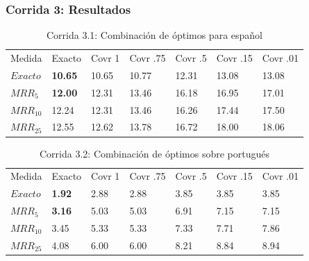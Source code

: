 \begin{frame}
\frametitle{Corrida 3: Resultados}


\begin{table}
\centering
\begin{center}
\begin{tabular}{|l | l | l | l | l | l | l |}

Medida & Exacto & Covr 1 & Covr .75 & Covr .5 & Covr .15 & Covr .01 \\ 
$Exacto$ & {\color{green}\textbf{10.65}} & 10.65 & 10.77 & 12.31 & 13.08 & 13.08  \\ 
$MRR_{5}$ & {\color{green}\textbf{12.00}} & 12.31 & 13.46 & 16.18 & 16.95 & 17.01  \\ 
$MRR_{10}$ & 12.24 & 12.31 & 13.46 & 16.26 & 17.44 & 17.50  \\ 
$MRR_{25}$ & 12.55 & 12.62 & 13.78 & 16.72 & 18.00 & 18.06  \\ 
\end{tabular}
\medskip
\caption{Corrida 3.1: Combinación de óptimos para español}
\label{table:optimos}
\end{center}
\end{table}

\begin{table}
\centering
\begin{center}
\begin{tabular}{|l | l | l | l | l | l | l |}

Medida & Exacto & Covr 1 & Covr .75 & Covr .5 & Covr .15 & Covr .01 \\ 
$Exacto$ & {\color{green}\textbf{1.92}} & 2.88 & 2.88 & 3.85 & 3.85 & 3.85  \\ 
$MRR_{5}$ & {\color{green}\textbf{3.16}} & 5.03 & 5.03 & 6.91 & 7.15 & 7.15  \\ 
$MRR_{10}$ & 3.45 & 5.33 & 5.33 & 7.33 & 7.71 & 7.86  \\ 
$MRR_{25}$ & 4.08 & 6.00 & 6.00 & 8.21 & 8.84 & 8.94  \\ 
\end{tabular}
\caption{Corrida 3.2: Combinación de óptimos sobre portugués}
\label{table:2_3_2_40_getExactMRRWikiFactoid_getCovrMRRWikiFactoid}
\end{center}
\end{table}

\end{frame}


